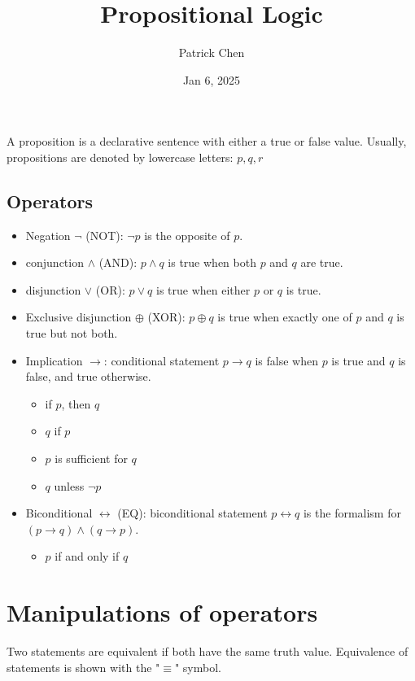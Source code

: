\documentclass{article}
\title{Propositional Logic}
\author{Patrick Chen}
\date{Jan 6, 2025}
\theoremstyle{mytheoremstyle}
\theoremstyle{mytheoremstyle}
\theoremstyle{myproblemstyle}
\begin{document}
    \maketitle
    A proposition is a declarative sentence with either a true or false value.
    Usually, propositions are denoted by lowercase letters: $p,q,r$
    \subsection*{Operators}
    \begin{itemize}
        \item Negation $\neg$ (NOT): $\neg p$ is the opposite of $p$.
        \item conjunction $\wedge$ (AND): $p\wedge q$ is true when both $p$ and
            $q$ are true.
        \item disjunction $\vee$ (OR): $p\vee q$ is true when either $p$ or
            $q$ is true.
        \item Exclusive disjunction $\oplus$ (XOR): $p\oplus q$ is true when exactly one of $p$
            and $q$ is true but not both.
        \item Implication $\rightarrow$: conditional statement $p\rightarrow q$
            is false when $p$ is true and $q$ is false, and true otherwise.
            \begin{itemize}
                \item if $p$, then $q$
                \item $q$ if $p$
                \item $p$ is sufficient for $q$
                \item $q$ unless $\neg p$
            \end{itemize}
        \item Biconditional $\leftrightarrow$ (EQ): biconditional statement
            $p\leftrightarrow q$ is the formalism for $(p \rightarrow q)\wedge(q
            \rightarrow p)$.
            \begin{itemize}
                \item $p$ if and only if $q$
            \end{itemize}
    \end{itemize}

    \section*{Manipulations of operators}
    Two statements are equivalent if both have the same truth value. Equivalence
    of statements is shown with the "$\equiv$" symbol. 
\end{document}

